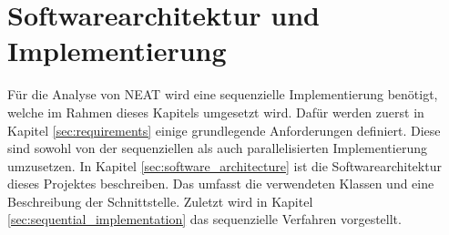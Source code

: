 \chapter{Softwarearchitektur und Implementierung}
\label{chap:software_architecture}
Für die Analyse von \ac{NEAT} wird eine sequenzielle Implementierung benötigt, welche im Rahmen dieses Kapitels umgesetzt wird. Dafür werden zuerst in Kapitel \ref{sec:requirements} einige grundlegende Anforderungen definiert. Diese sind sowohl von der sequenziellen als auch parallelisierten Implementierung umzusetzen. In Kapitel \ref{sec:software_architecture} ist die Softwarearchitektur dieses Projektes beschreiben. Das umfasst die verwendeten Klassen und eine Beschreibung der Schnittstelle. Zuletzt wird in Kapitel \ref{sec:sequential_implementation} das sequenzielle Verfahren vorgestellt.


